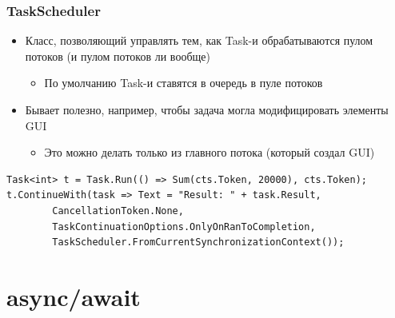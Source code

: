 \documentclass[xetex,mathserif,serif]{beamer}
\begin{document}
    \begin{frame}[fragile]
        \frametitle{TaskScheduler}
        \begin{itemize}
            \item Класс, позволяющий управлять тем, как Task-и обрабатываются пулом потоков (и пулом потоков ли вообще)
            \begin{itemize}
                \item По умолчанию Task-и ставятся в очередь в пуле потоков
            \end{itemize}
            \item Бывает полезно, например, чтобы задача могла модифицировать элементы GUI
            \begin{itemize}
                \item Это можно делать только из главного потока (который создал GUI)
            \end{itemize}
        \end{itemize}

        \begin{small}
            \begin{verbatim}
Task<int> t = Task.Run(() => Sum(cts.Token, 20000), cts.Token);
t.ContinueWith(task => Text = "Result: " + task.Result,
        CancellationToken.None,
        TaskContinuationOptions.OnlyOnRanToCompletion,
        TaskScheduler.FromCurrentSynchronizationContext());
            \end{verbatim}
        \end{small}
    \end{frame}

    \section{async/await}
\end{document}
